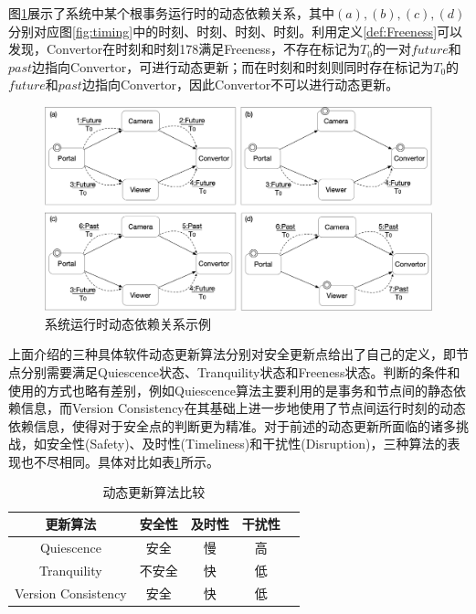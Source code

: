 \documentclass[macfonts,master]{njuthesis}
\begin{document}
图\ref{fig:dyn_dep}展示了系统中某个根事务运行时的动态依赖关系，其中$(a),(b),(c),(d)$分别对应图\ref{fig:timing}中的时刻、时刻、时刻、时刻。利用定义\ref{def:Freeness}可以发现，Convertor在时刻和时刻{178}满足Freeness，不存在标记为$T_0$的一对$future$和$past$边指向Convertor，可进行动态更新；而在时刻和时刻则同时存在标记为$T_0$的$future$和$past$边指向Convertor，因此Convertor不可以进行动态更新。

\begin{figure}[!htbp]
  \centering
  \includegraphics[width= 1.0\textwidth]{image/dyn_dep.png}
  \caption{系统运行时动态依赖关系示例}
  \label{fig:dyn_dep}
\end{figure}

上面介绍的三种具体软件动态更新算法分别对安全更新点给出了自己的定义，即节点分别需要满足Quiescence状态、Tranquility状态和Freeness状态。判断的条件和使用的方式也略有差别，例如Quiescence算法主要利用的是事务和节点间的静态依赖信息，而Version Consistency在其基础上进一步地使用了节点间运行时刻的动态依赖信息，使得对于安全点的判断更为精准。对于前述的动态更新所面临的诸多挑战，如安全性(Safety)、及时性(Timeliness)和干扰性(Disruption)，三种算法的表现也不尽相同。具体对比如表\ref{table:comparison}所示。

\begin{table}
  \centering
  \begin{tabular}{ccccp{20mm}}
    \toprule
    \textbf{更新算法} & \textbf{安全性} & \textbf{及时性} & \textbf{干扰性} \\
    \midrule
    Quiescence  & 安全 &  慢  & 高 \\
    Tranquility     & 不安全    &  快  & 低 \\
    Version Consistency     & 安全    &  快  & 低 \\
    \bottomrule
  \end{tabular}
  \caption{动态更新算法比较}
  \label{table:comparison}
\end{table}
\end{document}
